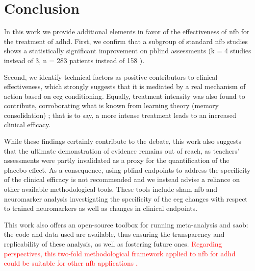 

\section{Conclusion}

In this work we provide additional elements in favor of the effectiveness of \gls{nfb} for the treatment of \gls{adhd}. First, 
we confirm that a subgroup of standard \gls{nfb} studies shows a statistically significant improvement on \gls{pblind} 
assessments (k = 4 studies instead of 3, n = 283 patients instead of 158 \citet{Cortese2016}). 

Second, we identify technical factors as positive contributors to clinical effectiveness, which strongly suggests 
that it is mediated by a real mechanism of action based on \gls{eeg} conditioning. Equally, treatment intensity was also found to 
contribute, corroborating what is known from learning theory (memory consolidation) \citep{Mowrer1960}; that is to say, 
a more intense treatment leads to an increased clinical efficacy.

While these findings certainly contribute to the debate, this work also suggests that the ultimate demonstration of evidence 
remains out of reach, as teachers’ assessments were partly invalidated as a proxy for the quantification of the placebo effect. 
As a consequence, using \gls{pblind} endpoints to address the specificity of the clinical efficacy is not recommended 
and we instead advise a reliance on other available methodological tools. These tools include sham \gls{nfb} and neuromarker 
analysis investigating the specificity of the \gls{eeg} changes with respect to trained neuromarkers as well as changes 
in clinical endpoints.

This work also offers an open-source toolbox for running meta-analysis and \gls{saob}: the code and data used are available, 
thus ensuring the transparency and replicability of these analysis, as well as fostering future ones.
\textcolor{red}{Regarding perspectives, this two-fold methodological framework applied to \gls{nfb} for \gls{adhd} could 
be suitable for other \gls{nfb} applications \citep{Marzbani2016}.} 

